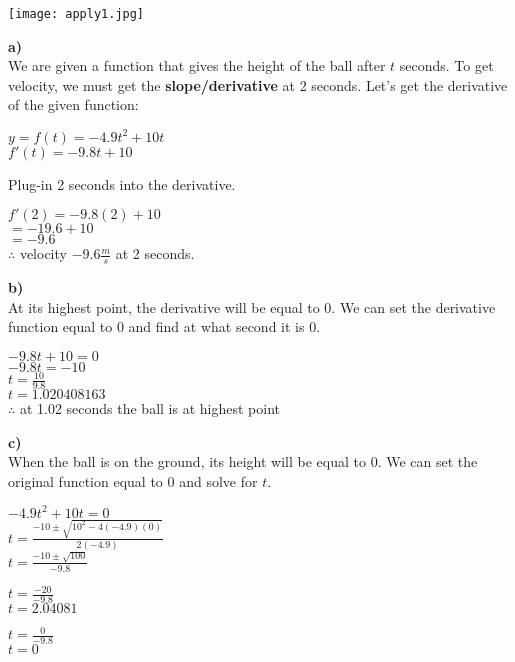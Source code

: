 \documentclass[12pt,fleqn]{book} %
\begin{document}
\texttt{[image: apply1.jpg]}

\noindent \textbf{a)} \\
We are given a function that gives the height of the ball after $t$ seconds. To get velocity, we must get the \textbf{slope/derivative} at 2 seconds. Let's get the derivative of the given function:

\begin{center}
    {\large $y=f(t)=-4.9t^2+10t$} \\
    {\large $f'(t)=-9.8t + 10$}
\end{center}

\noindent Plug-in 2 seconds into the derivative.

\begin{center}
    {\large $f'(2)=-9.8(2)+10$} \\
    {\large $=-19.6+10$} \\
    {\large $=-9.6$} \\
    $\therefore$ velocity $-9.6\frac{m}{s}$ at 2 seconds.
\end{center}

\noindent \textbf{b)} \\
At its highest point, the derivative will be equal to $0$. We can set the derivative function equal to 0 and find at what second it is 0.

\begin{center}
    {\large $-9.8t+10 =0$} \\
    {\large $-9.8t=-10$} \\
    {\large $t=\frac{10}{9.8}$} \\
    {\large $t=1.020408163$} \\
    $\therefore$ at 1.02 seconds the ball is at highest point
\end{center}

\noindent \textbf{c)} \\
When the ball is on the ground, its height will be equal to 0. We can set the original function equal to 0 and solve for $t$.

\begin{center}
    {\large $-4.9t^2+10t=0$} \\
    \vspace*{1mm}
    {\large $t=\frac{-10\pm\sqrt{10^2-4(-4.9)(0)}}{2(-4.9)}$} \\
    \vspace*{1mm}
    {\large $t=\frac{-10\pm\sqrt{100}}{-9.8}$}
    \begin{multicols}{2}
        {\large $t=\frac{-20}{-9.8}$} \\
        $t=2.04081$

        \columnbreak

        {\large $t=\frac{0}{-9.8}$} \\
        $t=0$
    \end{multicols}
\end{center}
\end{document}
